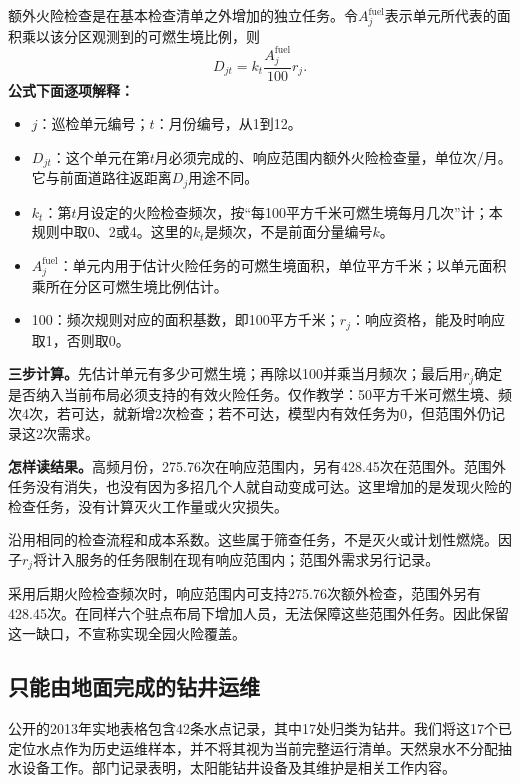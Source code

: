 \documentclass[12pt,a4paper]{article}
\numberwithin{equation}{section}
\begin{document}
额外火险检查是在基本检查清单之外增加的独立任务。令$A_j^{\mathrm{fuel}}$表示单元所代表的面积乘以该分区观测到的可燃生境比例，则
\begin{equation}
D_{jt}=k_t\frac{A_j^{\mathrm{fuel}}}{100}r_j.
\label{eq:firetasks}
\end{equation}
\noindent\textbf{公式下面逐项解释：}
\begin{itemize}
\item $j$：巡检单元编号；$t$：月份编号，从1到12。
\item $D_{jt}$：这个单元在第$t$月必须完成的、响应范围内额外火险检查量，单位次/月。它与前面道路往返距离$D_j$用途不同。
\item $k_t$：第$t$月设定的火险检查频次，按“每100平方千米可燃生境每月几次”计；本规则中取0、2或4。这里的$k_t$是频次，不是前面分量编号$k$。
\item $A_j^{\mathrm{fuel}}$：单元内用于估计火险任务的可燃生境面积，单位平方千米；以单元面积乘所在分区可燃生境比例估计。
\item 100：频次规则对应的面积基数，即100平方千米；$r_j$：响应资格，能及时响应取1，否则取0。
\end{itemize}
\noindent\textbf{三步计算。}先估计单元有多少可燃生境；再除以100并乘当月频次；最后用$r_j$确定是否纳入当前布局必须支持的有效火险任务。仅作教学：50平方千米可燃生境、频次4次，若可达，就新增2次检查；若不可达，模型内有效任务为0，但范围外仍记录这2次需求。

\noindent\textbf{怎样读结果。}高频月份，275.76次在响应范围内，另有428.45次在范围外。范围外任务没有消失，也没有因为多招几个人就自动变成可达。这里增加的是发现火险的检查任务，没有计算灭火工作量或火灾损失。

沿用相同的检查流程和成本系数。这些属于筛查任务，不是灭火或计划性燃烧。因子$r_j$将计入服务的任务限制在现有响应范围内；范围外需求另行记录。

采用后期火险检查频次时，响应范围内可支持275.76次额外检查，范围外另有428.45次。在同样六个驻点布局下增加人员，无法保障这些范围外任务。因此保留这一缺口，不宣称实现全园火险覆盖。
\clearpage

\subsection{只能由地面完成的钻井运维}
公开的2013年实地表格包含42条水点记录，其中17处归类为钻井\cite{water}。我们将这17个已定位水点作为历史运维样本，并不将其视为当前完整运行清单。天然泉水不分配抽水设备工作。部门记录表明，太阳能钻井设备及其维护是相关工作内容\cite{annual}。
\end{document}
